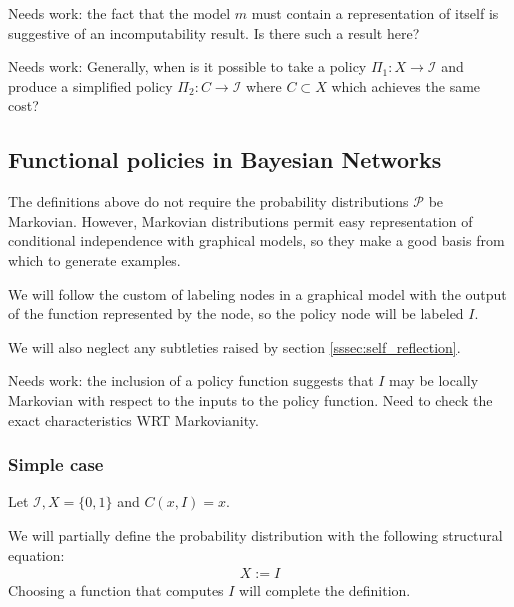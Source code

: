 Needs work: the fact that the model $m$ must contain a representation of itself is suggestive of an incomputability result. Is there such a result here?

Needs work: Generally, when is it possible to take a policy $\Pi_1:X\to\mathcal{I}$ and produce a simplified policy $\Pi_2:C\to\mathcal{I}$ where $C\subset X$ which achieves the same cost?


\subsection{Functional policies in Bayesian Networks}

The definitions above do not require the probability distributions $\mathcal{P}$ be Markovian. However, Markovian distributions permit easy representation of conditional independence with graphical models, so they make a good basis from which to generate examples.

We will follow the custom of labeling nodes in a graphical model with the output of the function represented by the node, so the policy node will be labeled $I$.

We will also neglect any subtleties raised by section \ref{sssec:self_reflection}.

Needs work: the inclusion of a policy function suggests that $I$ may be locally Markovian with respect to the inputs to the policy function. Need to check the exact characteristics WRT Markovianity.

\subsubsection{Simple case}\label{sssec:simple_case}

Let $\mathcal{I},X=\{0,1\}$ and $C(x,I)=x$.

\begin{center}
\end{center}

We will partially define the probability distribution with the following structural equation:
\begin{align*}
    X:=I
\end{align*}
Choosing a function that computes $I$ will complete the definition.

